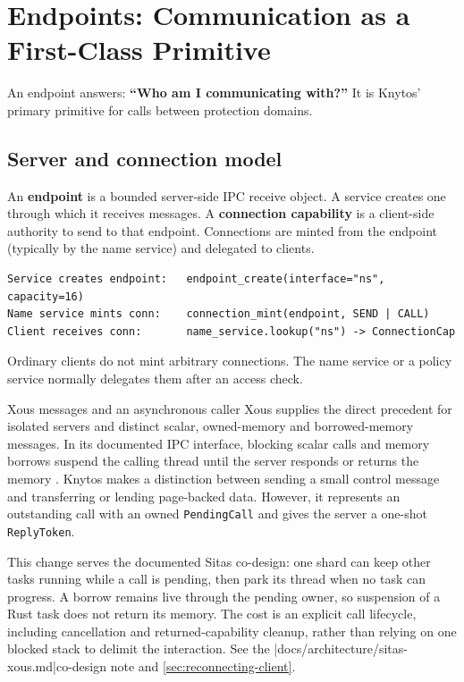 \chapter{Endpoints: Communication as a First-Class Primitive}
\label{chap:endpoints}

An endpoint answers: \textbf{``Who am I communicating with?''} It is
Knytos' primary primitive for calls between protection domains.

\section{Server and connection model}

An \textbf{endpoint} is a bounded server-side IPC receive object. A service
creates one through which it receives messages. A \textbf{connection capability}
is a client-side authority to send to that endpoint. Connections are minted
from the endpoint (typically by the name service) and delegated to clients.

\begin{verbatim}
Service creates endpoint:   endpoint_create(interface="ns", capacity=16)
Name service mints conn:    connection_mint(endpoint, SEND | CALL)
Client receives conn:       name_service.lookup("ns") -> ConnectionCap
\end{verbatim}

Ordinary clients do not mint arbitrary connections. The name service or a policy
service normally delegates them after an access check.

\begin{architecturalcomparison}{Xous messages and an asynchronous caller}
Xous supplies the direct precedent for isolated servers and distinct scalar,
owned-memory and borrowed-memory messages. In its documented IPC interface,
blocking scalar calls and memory borrows suspend the calling thread until the
server responds or returns the memory \cite{prior:xous}. Knytos makes
a distinction between sending a small control message and transferring or
lending page-backed data. However, it represents an outstanding call with an
owned \texttt{PendingCall} and gives the server a one-shot \texttt{ReplyToken}.

This change serves the documented Sitas co-design: one shard can keep other
tasks running while a call is pending, then park its thread when no task can
progress. A borrow remains live through the pending owner, so suspension of a
Rust task does not return its memory. The cost is an explicit call lifecycle,
including cancellation and returned-capability cleanup, rather than relying
on one blocked stack to delimit the interaction. See the
\repofiletext|docs/architecture/sitas-xous.md|{co-design note} and
\autoref{sec:reconnecting-client}.
\end{architecturalcomparison}

